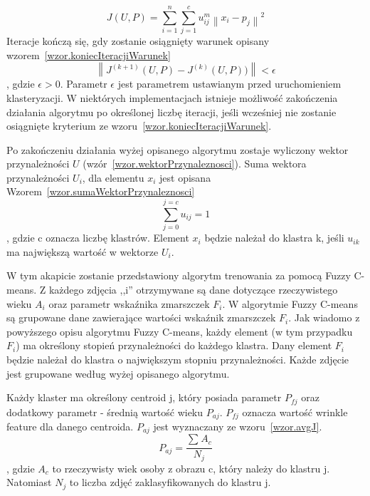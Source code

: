 \documentclass[a4paper,twoside,12pt]{book}
\begin{document}
    \large
    \begin{equation}
        J(U,P)= \sum_{i=1}^{n}\sum_{j=1}^{c}u_{ij}^{m}\left \| x_{i}-p_{j} \right \|^{2}
        \label{wzor.kryteriumFCM}
    \end{equation}
    \normalsize
    Iteracje kończą się, gdy zostanie osiągnięty warunek opisany wzorem~\ref{wzor.koniecIteracjiWarunek}
    \large
    \begin{equation}
        \left \| J^{(k+1)}(U,P) - J^{(k)}(U,P)) \right \| < \epsilon
        \label{wzor.koniecIteracjiWarunek}
    \end{equation}
    \normalsize
    , gdzie $\epsilon > 0$. Parametr $\epsilon$ jest parametrem ustawianym przed uruchomieniem klasteryzacji.
    W niektórych implementacjach istnieje możliwość zakończenia działania algorytmu po określonej liczbę iteracji,
    jeśli wcześniej nie zostanie osiągnięte kryterium ze wzoru~\ref{wzor.koniecIteracjiWarunek}.

    Po zakończeniu działania wyżej opisanego algorytmu zostaje wyliczony wektor przynależności $U$
    (wzór~\ref{wzor.wektorPrzynaleznosci}).
    Suma wektora przynależności $U_{i}$, dla elementu $x_{i}$ jest opisana
    Wzorem~\ref{wzor.sumaWektorPrzynaleznosci}
    \large
    \begin{equation}
        \sum_{j=0}^{j=c} u_{ij}=1
        \label{wzor.sumaWektorPrzynaleznosci}
    \end{equation}
    \normalsize
    , gdzie c oznacza liczbę klastrów.
    Element $x_{i}$ będzie należał do klastra k, jeśli $u_{ik}$ ma największą wartość w wektorze $U_{i}$.

    W tym akapicie zostanie przedstawiony algorytm trenowania za pomocą Fuzzy C-means.
    Z każdego zdjęcia ,,i'' otrzymywane są dane dotyczące rzeczywistego wieku $A_{i}$ oraz parametr wskaźnika zmarszczek
    $F_{i}$.
    W algorytmie Fuzzy C-means są grupowane dane zawierające wartości wskaźnik zmarszczek $F_{i}$.
    Jak wiadomo z powyższego opisu algorytmu Fuzzy C-means, każdy element (w tym przypadku $F_{i}$) ma określony stopień
    przynależności do każdego klastra. Dany element $F_{i}$ będzie należał do klastra o największym stopniu
    przynależności. Każde zdjęcie jest grupowane według wyżej opisanego algorytmu.

    Każdy klaster ma określony centroid j, który posiada parametr $P_{fj}$  oraz dodatkowy parametr - średnią
    wartość wieku $P_{aj}$. $P_{fj}$ oznacza wartość wrinkle feature dla danego centroida.
    $P_{aj}$ jest wyznaczany ze wzoru~\ref{wzor.avgJ}.
    \large
    \begin{equation}
        P_{aj}=\frac{\sum_{}^{}A_{c}}{N_{j}}
        \label{wzor.avgJ}
    \end{equation}
    \normalsize
    , gdzie $A_{c}$ to rzeczywisty wiek osoby z obrazu c, który należy do klastru j.
    Natomiast $N_{j}$ to liczba zdjęć zaklasyfikowanych do klastru j.
\end{document}
